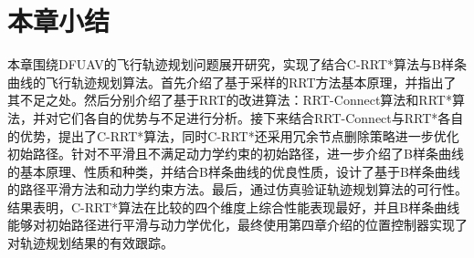 \section{本章小结}

本章围绕DFUAV的飞行轨迹规划问题展开研究，实现了结合C-RRT*算法与B样条曲线的飞行轨迹规划算法。首先介绍了基于采样的RRT方法基本原理，并指出了其不足之处。然后分别介绍了基于RRT的改进算法：RRT-Connect算法和RRT*算法，并对它们各自的优势与不足进行分析。接下来结合RRT-Connect与RRT*各自的优势，提出了C-RRT*算法，同时C-RRT*还采用冗余节点删除策略进一步优化初始路径。针对不平滑且不满足动力学约束的初始路径，进一步介绍了B样条曲线的基本原理、性质和种类，并结合B样条曲线的优良性质，设计了基于B样条曲线的路径平滑方法和动力学约束方法。最后，通过仿真验证轨迹规划算法的可行性。结果表明，C-RRT*算法在比较的四个维度上综合性能表现最好，并且B样条曲线能够对初始路径进行平滑与动力学优化，最终使用第四章介绍的位置控制器实现了对轨迹规划结果的有效跟踪。


